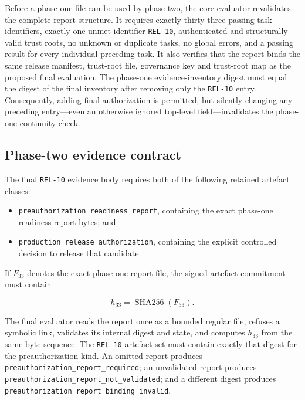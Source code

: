 Before a phase-one file can be used by phase two, the core evaluator
revalidates the complete report structure.  It requires exactly thirty-three
passing task identifiers, exactly one unmet identifier
\texttt{REL-10}, authenticated and structurally valid trust roots, no unknown or
duplicate tasks, no global errors, and a passing result for every individual
preceding task.  It also verifies that the report binds the same release manifest,
trust-root file, governance key and trust-root map as the proposed final
evaluation.  The phase-one evidence-inventory digest must equal the digest of the
final inventory after removing only the \texttt{REL-10} entry.  Consequently,
adding final authorization is permitted, but silently changing any preceding
entry---even an otherwise ignored top-level field---invalidates the phase-one
continuity check.

\subsection{Phase-two evidence contract}

The final \texttt{REL-10} evidence body requires both of the following retained
artefact classes:

\begin{itemize}
  \item \texttt{preauthorization\_readiness\_report}, containing the exact
        phase-one readiness-report bytes; and
  \item \texttt{production\_release\_authorization}, containing the explicit
        controlled decision to release that candidate.
\end{itemize}

If $F_{33}$ denotes the exact phase-one report file, the signed artefact commitment
must contain

\begin{equation}
  h_{33}=\operatorname{SHA256}(F_{33}).
\end{equation}

The final evaluator reads the report once as a bounded regular file, refuses a
symbolic link, validates its internal digest and state, and computes $h_{33}$ from
the same byte sequence.  The \texttt{REL-10} artefact set must contain exactly that
digest for the preauthorization kind.  An omitted report produces
\texttt{preauthorization\_report\_required}; an unvalidated report produces
\texttt{preauthorization\_report\_not\_validated}; and a different digest produces
\texttt{preauthorization\_report\_binding\_invalid}.

